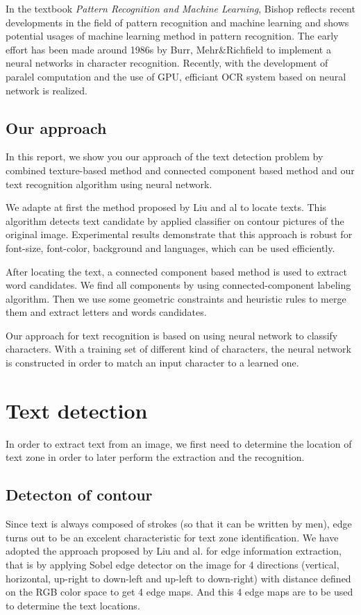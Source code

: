 \documentclass[paper=a4, french, 11pt]{scrartcl}
\begin{document}
In the textbook \textit{Pattern Recognition and Machine Learning}, Bishop reflects recent developments in the field of pattern recognition and machine learning and shows potential usages of machine learning method in pattern recognition. The early effort has been made around 1986s by Burr, Mehr\&Richfield to implement a neural networks in character recognition. Recently, with the development of paralel computation and the use of GPU, efficiant OCR system based on neural network is realized. 

\subsection{Our approach}
In this report, we show you our approach of the text detection problem by combined texture-based method and connected component based method and our text recognition algorithm using neural network. 

We adapte at first the method proposed by Liu and al to locate texts. This algorithm detects text candidate by applied classifier on contour pictures of the original image. Experimental results demonstrate that this approach is robust for font-size, font-color, background and languages, which can be used efficiently.

After locating the text, a connected component based method is used to extract word candidates. We find all components by using connected-component labeling algorithm. Then we use some geometric constraints and heuristic rules to merge them and extract letters and words candidates.  

Our approach for text recognition is based on using neural network to classify characters. With a training set of different kind of characters, the neural network is constructed in order to match an input character to a learned one. 

\section{Text detection}
In order to extract text from an image, we first need to determine the location of text zone in order to later perform the extraction and the recognition.  
\subsection{Detecton of contour}
Since text is always composed of strokes (so that it can be written by men), edge turns out to be an excelent characteristic for text zone identification. We have adopted the approach proposed by Liu and al. for edge information extraction, that is by applying Sobel edge detector on the image for 4 directions (vertical, horizontal, up-right to down-left and up-left to down-right) with distance defined on the RGB color space to get 4 edge maps. And this 4 edge maps are to be used to determine the text locations.
\end{document}
